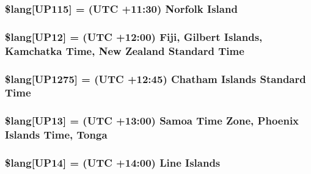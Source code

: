 \subsubsection[{\$lang}]{\setlength{\rightskip}{0pt plus 5cm}\$lang\mbox{[}\textquotesingle{}U\+P115\textquotesingle{}\mbox{]} = \textquotesingle{}(U\+T\+C +11\+:30) Norfolk Island\textquotesingle{}}\label{date__lang_8php_a46fa8957c8e606d1641bbcdd75cd2df0}
\hypertarget{date__lang_8php_a18a8bb072c3fe7db99091538ce5168be}{}
\subsubsection[{\$lang}]{\setlength{\rightskip}{0pt plus 5cm}\$lang\mbox{[}\textquotesingle{}U\+P12\textquotesingle{}\mbox{]} = \textquotesingle{}(U\+T\+C +12\+:00) Fiji, Gilbert Islands, Kamchatka Time, New Zealand Standard Time\textquotesingle{}}\label{date__lang_8php_a18a8bb072c3fe7db99091538ce5168be}
\hypertarget{date__lang_8php_a92e3c23bd9d963bbdfd21e39521bfdc1}{}
\subsubsection[{\$lang}]{\setlength{\rightskip}{0pt plus 5cm}\$lang\mbox{[}\textquotesingle{}U\+P1275\textquotesingle{}\mbox{]} = \textquotesingle{}(U\+T\+C +12\+:45) Chatham Islands Standard Time\textquotesingle{}}\label{date__lang_8php_a92e3c23bd9d963bbdfd21e39521bfdc1}
\hypertarget{date__lang_8php_ac197fec09ff547ca12a7fe3ffc5908ae}{}
\subsubsection[{\$lang}]{\setlength{\rightskip}{0pt plus 5cm}\$lang\mbox{[}\textquotesingle{}U\+P13\textquotesingle{}\mbox{]} = \textquotesingle{}(U\+T\+C +13\+:00) Samoa Time Zone, Phoenix Islands Time, Tonga\textquotesingle{}}\label{date__lang_8php_ac197fec09ff547ca12a7fe3ffc5908ae}
\hypertarget{date__lang_8php_a50562230c497ebdba1f540d409110fce}{}
\subsubsection[{\$lang}]{\setlength{\rightskip}{0pt plus 5cm}\$lang\mbox{[}\textquotesingle{}U\+P14\textquotesingle{}\mbox{]} = \textquotesingle{}(U\+T\+C +14\+:00) Line Islands\textquotesingle{}}\label{date__lang_8php_a50562230c497ebdba1f540d409110fce}
